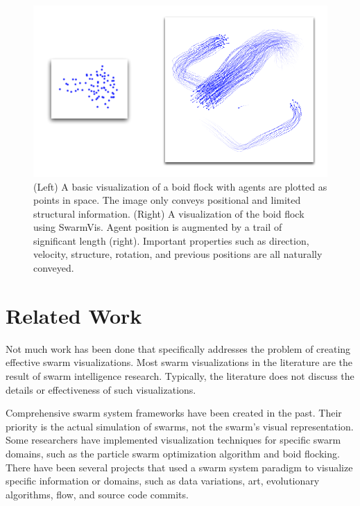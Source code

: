 \documentclass{vgtc}
\begin{document}
\begin{figure}[ht]
\centering
\includegraphics[scale=.55]{images/intro.pdf}
\caption{(Left) A basic visualization of a boid flock with agents are plotted as
points in space. The image only conveys positional and limited structural information.
(Right) A visualization of the boid flock using SwarmVis. Agent
position is augmented by a trail of significant length (right).
Important properties such as direction, velocity, structure, rotation,
and previous positions are all naturally conveyed.
}
\label{Intro}
\end{figure}




\section{Related Work}
Not much work has been done that specifically addresses the problem of creating effective swarm visualizations.
Most swarm visualizations in the literature are the result of swarm intelligence research.
Typically, the literature does not discuss the details or effectiveness of such visualizations. 

Comprehensive  swarm system frameworks\cite{Luke}\cite{860347} have been created in the past.
Their priority is the actual simulation of swarms, not the swarm's visual representation.
Some researchers have implemented visualization techniques for specific swarm domains,
such as the particle swarm optimization algorithm\cite{Secrest} and boid flocking\cite{reynolds1987}.
There have been several projects that used a swarm system paradigm to visualize specific information or domains, such as data variations\cite{1382896}, art\cite{Boyd}, evolutionary algorithms\cite{spector2005ecb}\cite{Spector02evolutionarydynamics},
flow\cite{10.1109/TVCG.2005.87}\cite{Merzkirch}, and source code commits\cite{codeswarm:website}.
\end{document}
